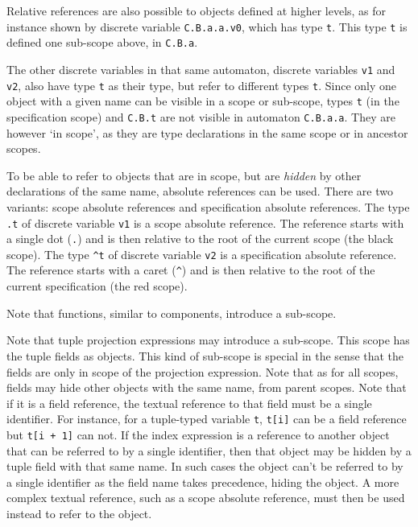 \documentclass{report}
\begin{document}
Relative references are also possible to objects defined at higher levels,
as for instance shown by discrete variable \texttt{C.B.a.a.v0}, which has type
\texttt{t}. This type \texttt{t} is defined one sub-scope above, in
\texttt{C.B.a}.

The other discrete variables in that same automaton, discrete variables
\texttt{v1} and
\texttt{v2}, also have type \texttt{t} as their type, but refer to different
types \texttt{t}. Since only one object with a given name can be visible in
a scope or sub-scope, types \texttt{t} (in the specification scope) and
\texttt{C.B.t} are not visible in automaton \texttt{C.B.a.a}. They are however
`in scope', as they are type declarations in the same scope or in ancestor
scopes.

To be able to refer to objects that are in scope, but are \emph{hidden} by
other declarations of the same name, absolute references can be used. There
are two variants: scope absolute references and specification absolute
references. The type \texttt{.t} of discrete variable \texttt{v1} is a scope
absolute
reference. The reference starts with a single dot (\texttt{.}) and is then
relative to the root of the current scope (the black scope). The type
\texttt{\^{}t} of discrete variable \texttt{v2} is a specification absolute
reference. The reference starts with a caret (\texttt{\^}) and is then
relative to the root of the current specification (the red scope).

Note that functions, similar to components, introduce a sub-scope.

Note that tuple projection expressions may introduce a sub-scope. This scope has
the tuple fields as objects. This kind of sub-scope is special in the sense that
the fields are only in scope of the projection expression. Note that as for all
scopes, fields may hide other objects with the same name, from parent scopes.
Note that if it is a field reference, the textual reference to that field must be
a single identifier. For instance, for a tuple-typed variable \texttt{t},
\texttt{t[i]} can be a field reference but \texttt{t[i + 1]} can not. If the
index expression is a reference to another object that can be referred to by a
single identifier, then that object may be hidden by a tuple field with that same
name. In such cases the object can't be referred to by a single identifier as the
field name takes precedence, hiding the object. A more complex textual reference,
such as a scope absolute reference, must then be used instead to refer to the
object.
\end{document}
